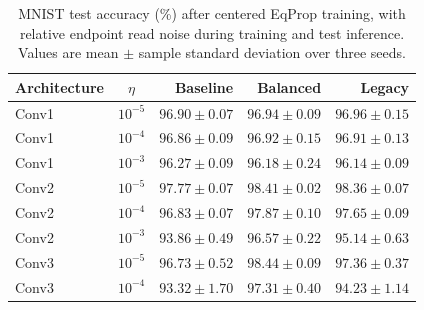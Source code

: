 \begin{table}[!htbp]
\centering
\small
\setlength{\tabcolsep}{6pt}
\begin{tabular}{lcrrr}
\toprule
Architecture & $\eta$ & Baseline & Balanced & Legacy \\
\midrule
Conv1 & $10^{-5}$ & $96.90 \pm 0.07$ & $96.94 \pm 0.09$ & $96.96 \pm 0.15$ \\
Conv1 & $10^{-4}$ & $96.86 \pm 0.09$ & $96.92 \pm 0.15$ & $96.91 \pm 0.13$ \\
Conv1 & $10^{-3}$ & $96.27 \pm 0.09$ & $96.18 \pm 0.24$ & $96.14 \pm 0.09$ \\
\addlinespace
Conv2 & $10^{-5}$ & $97.77 \pm 0.07$ & $98.41 \pm 0.02$ & $98.36 \pm 0.07$ \\
Conv2 & $10^{-4}$ & $96.83 \pm 0.07$ & $97.87 \pm 0.10$ & $97.65 \pm 0.09$ \\
Conv2 & $10^{-3}$ & $93.86 \pm 0.49$ & $96.57 \pm 0.22$ & $95.14 \pm 0.63$ \\
\addlinespace
Conv3 & $10^{-5}$ & $96.73 \pm 0.52$ & $98.44 \pm 0.09$ & $97.36 \pm 0.37$ \\
Conv3 & $10^{-4}$ & $93.32 \pm 1.70$ & $97.31 \pm 0.40$ & $94.23 \pm 1.14$ \\
\bottomrule
\end{tabular}
\caption{MNIST test accuracy (\%) after centered EqProp training, with relative endpoint read noise during training and test inference. Values are mean $\pm$ sample standard deviation over three seeds.}
\label{tab:eqprop-read-noise-test}
\end{table}
